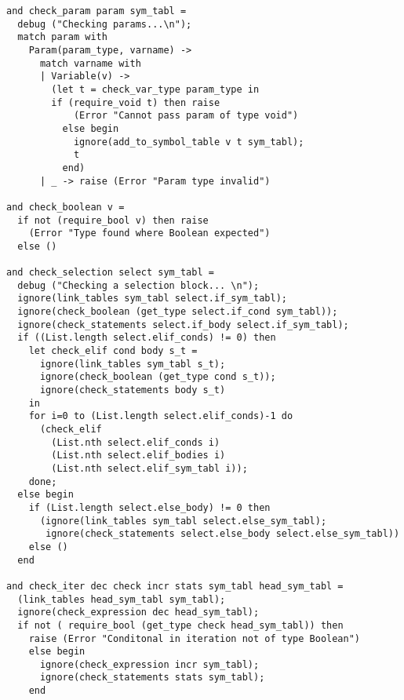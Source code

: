 \begin{verbatim}
and check_param param sym_tabl =
  debug ("Checking params...\n");
  match param with
    Param(param_type, varname) ->
      match varname with
      | Variable(v) ->
        (let t = check_var_type param_type in
        if (require_void t) then raise
            (Error "Cannot pass param of type void")
          else begin
            ignore(add_to_symbol_table v t sym_tabl);
            t
          end)
      | _ -> raise (Error "Param type invalid")

and check_boolean v =
  if not (require_bool v) then raise
    (Error "Type found where Boolean expected")
  else ()

and check_selection select sym_tabl =
  debug ("Checking a selection block... \n");
  ignore(link_tables sym_tabl select.if_sym_tabl);
  ignore(check_boolean (get_type select.if_cond sym_tabl));
  ignore(check_statements select.if_body select.if_sym_tabl);
  if ((List.length select.elif_conds) != 0) then
    let check_elif cond body s_t =
      ignore(link_tables sym_tabl s_t);
      ignore(check_boolean (get_type cond s_t));
      ignore(check_statements body s_t)
    in
    for i=0 to (List.length select.elif_conds)-1 do
      (check_elif
        (List.nth select.elif_conds i)
        (List.nth select.elif_bodies i)
        (List.nth select.elif_sym_tabl i));
    done;
  else begin
    if (List.length select.else_body) != 0 then
      (ignore(link_tables sym_tabl select.else_sym_tabl);
       ignore(check_statements select.else_body select.else_sym_tabl))
    else ()
  end

and check_iter dec check incr stats sym_tabl head_sym_tabl =
  (link_tables head_sym_tabl sym_tabl);
  ignore(check_expression dec head_sym_tabl);
  if not ( require_bool (get_type check head_sym_tabl)) then
    raise (Error "Conditonal in iteration not of type Boolean")
    else begin
      ignore(check_expression incr sym_tabl);
      ignore(check_statements stats sym_tabl);
    end


\end{verbatim}
